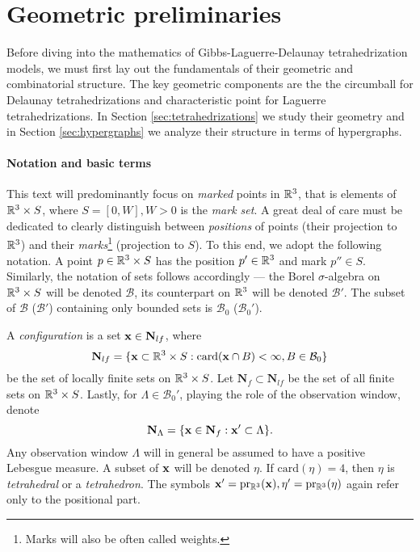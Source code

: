 \chapter{Geometric preliminaries}\label{ch:1}
Before diving into the mathematics of Gibbs-Laguerre-Delaunay tetrahedrization models, we must first lay out the fundamentals of their geometric and combinatorial structure. The key geometric components are the the circumball for Delaunay tetrahedrizations and characteristic point for Laguerre tetrahedrizations. In Section \ref{sec:tetrahedrizations} we study their geometry and in Section \ref{sec:hypergraphs} we analyze their structure in terms of hypergraphs.

\subsubsection{Notation and basic terms}
This text will predominantly focus on \textit{marked} points in ${\mathbb R^3}$, that is elements of ${\mathbb R^3} \times S$, where $S=[0,W],W>0$ is the \textit{mark set}. A great deal of care must be dedicated to clearly distinguish between \textit{positions} of points (their projection to ${\mathbb R^3}$) and their \textit{marks}\footnote{Marks will also be often called weights.} (projection to $S$). To this end, we adopt the following notation. A point $p \in {\mathbb R^3}\times S$ has the position $p'\in {\mathbb R^3}$ and mark $p'' \in S$. Similarly, the notation of sets follows accordingly --- the Borel $\sigma$-algebra on ${\mathbb R^3}\times S$ will be denoted $\mathcal B$, its counterpart on ${\mathbb R^3}$ will be denoted $\mathcal B'$. The subset of $\mathcal B$ ($\mathcal B'$) containing only bounded sets is $\mathcal B_0$ ($\mathcal B_0'$). 

A \textit{configuration} is a set ${\mathbf{x}} \in \mathbf N_{lf}$, where 
$$\mathbf N_{lf} = \{{\mathbf{x}} \subset {\mathbb R^3}\times S: \mathrm{card}({\mathbf{x}} \cap B) < \infty, B\in \mathcal B_0\} $$ 
be the set of locally finite sets on ${\mathbb R^3}\times S$. Let $\mathbf N_{f} \subset \mathbf N_{lf}$ be the set of all finite sets on ${\mathbb R^3}\times S$. Lastly, for $\Lambda \in \mathcal B_0'$, playing the role of the observation window, denote 
$$\mathbf N_\Lambda = \{ {\mathbf{x}} \in \mathbf N_{f}: {\mathbf{x}}'\subset \Lambda\}.$$
 Any observation window $\Lambda$ will in general be assumed to have a positive Lebesgue measure.
A subset of ${\mathbf{x}}$ will be denoted $\eta$. If $\mathrm{card}(\eta)=4$, then $\eta$ is \textit{tetrahedral} or a \textit{tetrahedron}. The symbols ${\mathbf{x}}'=\mathrm{pr_{{\mathbb R^3}}}({\mathbf{x}}), \eta'=\mathrm{pr_{{\mathbb R^3}}}(\eta)$ again refer only to the positional part. 


